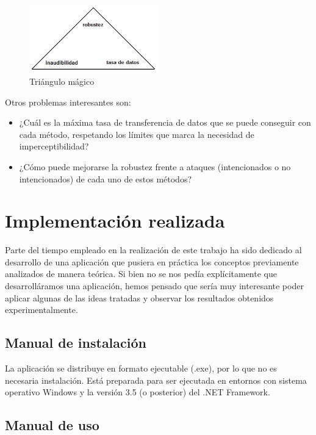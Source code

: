 \documentclass[12pt]{article}
\begin{document}
\begin{figure}[h]
  \centering
    \includegraphics[width=0.5\textwidth]{img/magictriangle}
  \caption{Triángulo mágico}
  \label{magictriangle}
\end{figure}

Otros problemas interesantes son:

\begin{itemize}

\item ¿Cuál es la máxima tasa de transferencia de datos que se puede conseguir con cada método, respetando los límites que marca la necesidad de imperceptibilidad?

\item ¿Cómo puede mejorarse la robustez frente a ataques (intencionados o no intencionados) de cada uno de estos métodos?

\end{itemize}

\newpage
\section{Implementación realizada}

Parte del tiempo empleado en la realización de este trabajo ha sido dedicado al desarrollo de una aplicación que pusiera en práctica los conceptos previamente analizados de manera teórica. Si bien no se nos pedía explícitamente que desarrolláramos una aplicación, hemos pensado que sería muy interesante poder aplicar algunas de las ideas tratadas y observar los resultados obtenidos experimentalmente.

\subsection{Manual de instalación}

La aplicación se distribuye en formato ejecutable (.exe), por lo que no es necesaria instalación. Está preparada para ser ejecutada en entornos con sistema operativo Windows y la versión 3.5 (o posterior) del .NET Framework.

\subsection{Manual de uso}
\end{document}
